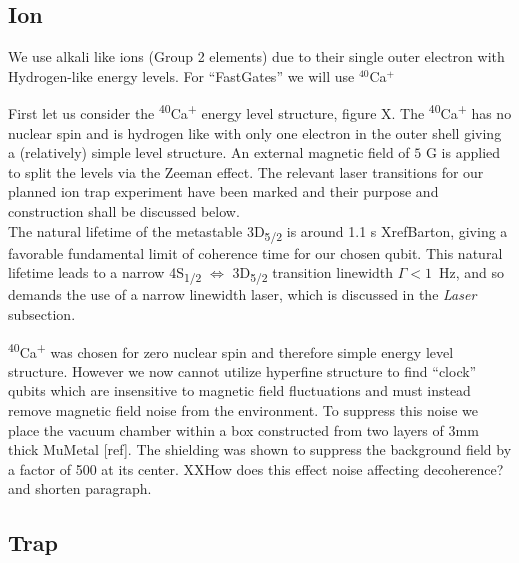 \documentclass[12pt]{iopart}
\begin{document}
\subsection{Ion}
We use alkali like ions (Group 2 elements) due to their single outer electron with Hydrogen-like energy levels. For ``FastGates'' we will use $^{40}$Ca$^+$

First let us consider the \textsuperscript{40}Ca\textsuperscript{+} energy
level structure, figure X. The \textsuperscript{40}Ca\textsuperscript{+} has
no nuclear spin and is hydrogen like with only one electron in the outer shell
giving a (relatively) simple level structure. An external magnetic
field of $5$ G is applied to split the levels via the Zeeman effect. The relevant
laser transitions for our planned ion trap experiment have been marked
and their purpose and construction shall be discussed below.\\

The natural lifetime of the metastable
3D\textsubscript{5/2} is around 1.1 s XrefBarton, giving a favorable
fundamental limit of coherence time for our chosen qubit.
This natural lifetime leads to a narrow 4S\textsubscript{1/2} $\Leftrightarrow$
3D\textsubscript{5/2} transition linewidth $\Gamma < 1$~Hz, and so
demands the use of a narrow linewidth laser, which is discussed in the \textit{Laser} subsection.

\textsuperscript{40}Ca\textsuperscript{+} was chosen for zero nuclear
spin and therefore simple energy level structure. However we now
cannot utilize hyperfine structure to find ``clock'' qubits which are
insensitive to magnetic field fluctuations and must instead remove
magnetic field noise from the environment. To suppress this noise 
we place the vacuum chamber within a box constructed from two layers
of 3mm thick MuMetal [ref]. The shielding was shown to suppress the
background field by a factor of 500 at its center. XXHow does this
effect noise affecting decoherence? and shorten paragraph.

\subsection{Trap}
\end{document}
